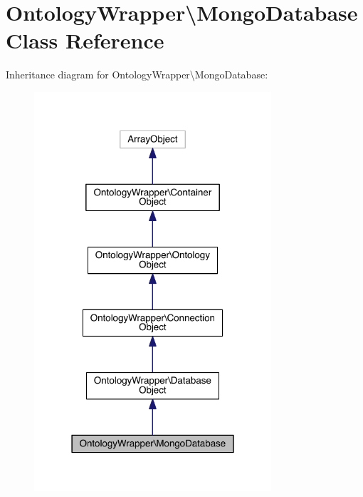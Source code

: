 \hypertarget{class_ontology_wrapper_1_1_mongo_database}{\section{Ontology\-Wrapper\textbackslash{}Mongo\-Database Class Reference}
\label{class_ontology_wrapper_1_1_mongo_database}
}


Inheritance diagram for Ontology\-Wrapper\textbackslash{}Mongo\-Database\-:\nopagebreak
\begin{figure}[H]
\begin{center}
\leavevmode
\includegraphics[width=250pt]{class_ontology_wrapper_1_1_mongo_database__inherit__graph}
\end{center}
\end{figure}


